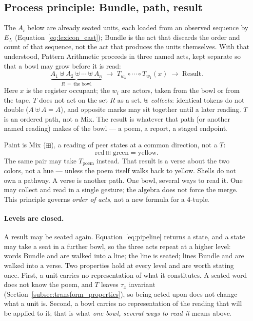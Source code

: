 \documentclass[12pt, a4paper]{article}
\begin{document}
\subsection{Process principle: Bundle, path, result}
\label{subsec:process_principle}
The $A_i$ below are already seated units, each loaded from an
observed sequence by $E_L$ (Equation~\eqref{eq:lexicon_cast});
Bundle is the act that discards the order and count of that
sequence, not the act that produces the units themselves. With that
understood, Pattern Arithmetic proceeds in three named acts, kept separate so that a bowl may grow before it is read:
\begin{equation}
    \underbrace{A_1 \uplus A_2 \uplus \cdots \uplus A_n}_{R\ =\ \text{the bowl}}
    \;\longrightarrow\;
    T_{w_k}\circ \cdots \circ T_{w_1}(x)
    \;\longrightarrow\;
    \text{Result}.
    \label{eq:pipeline}
\end{equation}
Here $x$ is the register occupant; the $w_i$ are actors, taken from
the bowl or from the tape. $T$ does not act on the set $R$ as a set.
$\uplus$ \emph{collects}: identical tokens do not double ($A \uplus A = A$), and opposite marks may sit together until a later reading. $T$ is an ordered path, not a Mix. The result is whatever that path (or another named reading) makes of the bowl --- a poem, a report, a staged endpoint.

Paint is Mix ($\boxplus$), a reading of peer states at a common direction, not a $T$:
\[
\mathrm{red}\boxplus\mathrm{green} = \mathrm{yellow}.
\]
The same pair may take $T_{\mathrm{poem}}$ instead. That result is a
verse about the two colors, not a hue --- unless the poem itself
walks back to yellow. Shells do not own a pathway. A verse is another
path. One bowl, several ways to read it. One may collect
and read in a single gesture; the algebra does not force the merge.
This principle governs \emph{order of acts}, not a new formula
for a 4-tuple.

\paragraph{Levels are closed.}
A result may be seated again. Equation~\eqref{eq:pipeline} returns a
state, and a state may take a seat in a further bowl, so the three
acts repeat at a higher level: words Bundle and are walked into a
line; the line is seated; lines Bundle and are walked into a verse.
Two properties hold at every level and are worth stating once. First,
a unit carries no representation of what it constitutes. A seated word
does not know the poem, and $T$ leaves $\tau_x$ invariant
(Section~\ref{subsec:transform_properties}), so being acted upon does
not change what a unit is. Second, a bowl carries no representation of
the reading that will be applied to it; that is what \emph{one bowl,
several ways to read it} means above.
\end{document}
